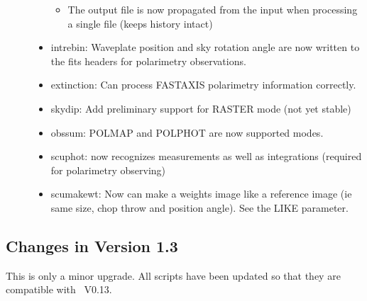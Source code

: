 \documentclass[twoside,11pt]{article}
\newcommand{\Kappa}{\xref{{\sc{Kappa}}}{sun95}{}}
\newcommand{\task}[1]{{\sf #1}}
\newcommand{\intrebin}{\htmlref{\task{intrebin}}{INTREBIN}}
\newcommand{\skydip}{\htmlref{\task{skydip}}{SKYDIP}}
\newcommand{\scuphot}{\htmlref{\task{scuphot}}{SCUPHOT}}
\newcommand{\ext}{\htmlref{\task{extinction}}{EXTINCTION}}
\newcommand{\obssum}{\htmlref{\task{obssum}}{OBSSUM}}
\newcommand{\scumakewt}{\htmlref{\task{scumakewt}}{SCUMAKEWT}}
\newcommand{\htmlref}[2]{#1}
\newcommand{\xref}[3]{#1}
\renewcommand{\_}{\texttt{\symbol{95}}}
\begin{document}
\begin{description}
\begin{itemize}
\begin{itemize}
\item  The output file is now propagated from the input when
           processing a single file (keeps history intact)

\end{itemize}

\item \intrebin : Waveplate position and sky rotation angle are now
        written to the fits headers for polarimetry observations.

\item \ext : Can process FAST\_AXIS polarimetry information correctly.

\item \skydip : Add preliminary support for RASTER mode (not yet stable)

\item \obssum : POLMAP and POLPHOT are now supported modes.

\item \scuphot : now recognizes measurements as well as integrations
      (required for polarimetry observing)

\item \scumakewt : Now can make a weights image like a reference image
     (ie same size, chop throw and position angle). See the LIKE parameter.

\end{itemize}

\end{description}

\subsection{Changes in Version 1.3}

This is only a minor upgrade. All scripts have been updated so that
they are compatible with \Kappa\ V0.13.
\end{document}
